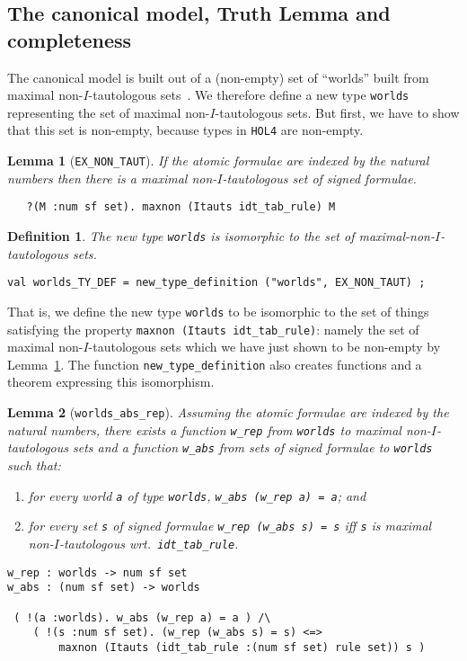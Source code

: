 \documentclass[a4paper]{article}
\newtheorem{lemma}{Lemma}
\newtheorem{definition}{Definition}
\newcommand{\hol}{\texttt{HOL4}}
\begin{document}
\subsection{The canonical model, Truth Lemma and completeness}

The canonical model is built out of a (non-empty) set of ``worlds''
built from maximal non-$I$-tautologous
sets~\cite[just above Theorem~3]{fitting-dual-tableau}. We therefore define a new type
\texttt{worlds} representing the set of maximal non-$I$-tautologous
sets. But first, we have to show that this set is non-empty, because
types in \hol{} are non-empty.

\begin{lemma}[\texttt{EX\_NON\_TAUT}]\label{EX-NON-TAUT}
If the atomic formulae are indexed by the natural numbers
then there is a maximal non-$I$-tautologous set of signed formulae.
\begin{verbatim}
   ?(M :num sf set). maxnon (Itauts idt_tab_rule) M
\end{verbatim}
\end{lemma}

\begin{definition}
  The new type \texttt{worlds} is isomorphic to the set of 
  maximal-non-$I$-tautologous sets.
\begin{verbatim}
val worlds_TY_DEF = new_type_definition ("worlds", EX_NON_TAUT) ;
\end{verbatim}
\end{definition}

That is, we define the new type \texttt{worlds} to be isomorphic to
the set of things satisfying the property \texttt{maxnon (Itauts
  idt\_tab\_rule)}: namely the set of maximal non-$I$-tautologous sets
which we have just shown to be non-empty by
Lemma~\ref{EX-NON-TAUT}.
%
The function \texttt{new\_type\_definition} also creates functions
and a theorem expressing this isomorphism.

\begin{lemma}[\texttt{worlds\_abs\_rep}]
Assuming the atomic formulae are indexed by the natural numbers,
there exists a function \texttt{w\_rep} from \texttt{worlds} to 
maximal non-$I$-tautologous sets 
and a function \texttt{w\_abs} from 
sets of signed formulae to \texttt{worlds} such that:
\begin{enumerate}
\item for every world \texttt{a} of type \texttt{worlds}, \texttt{w\_abs
    (w\_rep a) = a}; and
\item for every set \texttt{s} of signed formulae 
  \texttt{w\_rep (w\_abs s) = s} iff \texttt{s} is
  maximal non-$I$-tautologous wrt.\ \texttt{idt\_tab\_rule}.
\end{enumerate}
\begin{verbatim}
w_rep : worlds -> num sf set
w_abs : (num sf set) -> worlds

 ( !(a :worlds). w_abs (w_rep a) = a ) /\ 
    ( !(s :num sf set). (w_rep (w_abs s) = s) <=> 
        maxnon (Itauts (idt_tab_rule :(num sf set) rule set)) s )
\end{verbatim}
\end{lemma}
\end{document}
